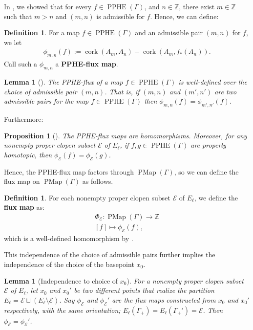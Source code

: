 \documentclass[11pt]{amsart}
\theoremstyle{plain}
\newtheorem{PROP}[THM]{Proposition}
\newtheorem{LEM}[THM]{Lemma}
\theoremstyle{definition}
\newtheorem{DEF}[THM]{Definition}
\DeclareMathOperator{\PMap}{PMap}
\DeclareMathOperator{\PPHE}{PPHE}
\DeclareMathOperator{\cork}{cork}
\newcommand{\Z}{\mathbb{Z}}
\newcommand{\cE}{\mathcal{E}}
\def\G{{\Gamma}}
\newcommand{\<}{\langle}
\renewcommand{\>}{\rangle}
\begin{document}
In \cite[Corollary 7.8]{DHK2023}, we showed that for every $f \in \PPHE(\G)$, and $n \in \Z$, there exist $m \in \Z$ such that $m>n$ and $(m,n)$ is admissible for $f$. Hence, we can define:

\begin{DEF}
For a map $f \in \PPHE(\Gamma)$ and an admissible pair $(m,n)$ for $f$, we let
\begin{align*}
    \phi_{m,n}(f) := \cork(A_{m},A_{n}) - \cork(A_{m},f_{*}(A_{n})). 
\end{align*}
Call such a $\phi_{m,n}$ a \textbf{PPHE-flux map}.
\end{DEF}

\begin{LEM}[{\cite[Lemma 7.10]{DHK2023}}] \label{LEM:ind}
    The PPHE-flux of a map $f \in \PPHE(\G)$ is well-defined over the choice of admissible pair $(m,n)$. That is, if $(m,n)$ and $(m',n')$ are two admissible pairs for the map $f \in \PPHE(\Gamma)$ then $\phi_{m,n}(f) = \phi_{m',n'}(f)$. 
\end{LEM}

Furthermore:

\begin{PROP}[{\cite[Proposition 7.11 and Lemma 7.12]{DHK2023}}] \label{prop:fluxmapsWD}The PPHE-flux maps are homomorphisms. Moreover, for any nonempty proper clopen subset $\cE$ of $E_\ell$, if $f,g \in \PPHE(\G)$ are properly homotopic, then $\phi_\cE(f) = \phi_\cE(g)$.
\end{PROP}
Hence, the PPHE-flux map factors through $\PMap(\G)$, so
we can define the flux map on $\PMap(\G)$ as follows.

\begin{DEF}\label{def:fluxmapPMap}
For each nonempty proper clopen subset $\cE$ of $E_\ell$, we define the \textbf{flux map} as:
\begin{align*}
    \Phi_\cE:\PMap(\Gamma) \rightarrow \Z \\
    [f] \mapsto \phi_\cE(f),
\end{align*}
which is a well-defined homomorphism by .
\end{DEF}

This independence of the choice of admissible pairs further implies the independence of the choice of the basepoint $x_0$.

\begin{LEM}[Independence to choice of $x_0$] \label{LEM:indBP}
    For a nonempty proper clopen subset $\cE$ of $E_\ell$, let $x_0$ and $x_0'$ be two different points that realize the partition $E_\ell = \cE \sqcup (E_\ell \setminus \cE)$. Say $\phi_\cE$ and $\phi_{\cE}'$ are the flux maps constructed from $x_0$ and $x_0'$ respectively, with the same orientation; $E_\ell(\G_+) = E_\ell(\G_+') = \cE$. Then $\phi_{\cE} = \phi_{\cE}'$.
\end{LEM} 
\end{document}
